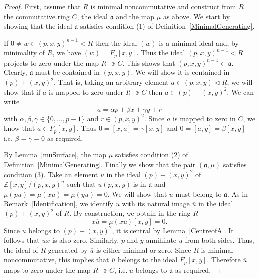 \documentclass[11pt]{article}
\theoremstyle{definition}
\begin{document}
\begin{proof}
First, assume that $R$ is minimal noncommutative and construct from $R$ the commutative ring $C$, the ideal $\mathfrak{a}$ and the map $\mu$ as above. We start by showing that the ideal $\mathfrak{a}$ satisfies condition (1) of Definition~\ref{MinimalGenerating}.

If $0\neq w\in(p,x,y)^{n-1}\lhd R$ then the ideal $(w)$ is a minimal ideal and, by minimality of $R$, we have $(w)=F_p[x,y]$. Thus the ideal $(p,x,y)^{n-1}\lhd R$ projects to zero under the map $R\twoheadrightarrow C$. This shows that $(p,x,y)^{n-1}\subset \mathfrak{a}$. Clearly, $\mathfrak{a}$ must be contained in $(p,x,y)$. We will show it is contained in $(p)+(x,y)^2$. That is, taking an arbitrary element $a\in(p,x,y)\lhd R$, we will show that if $a$ is mapped to zero under $R\twoheadrightarrow C$ then $a\in(p)+(x,y)^2$. We can write
\[a=\alpha p+\beta x +\gamma y+r\]
with $\alpha,\beta,\gamma\in\lbrace0,\ldots,p-1\rbrace$ and $r\in (p,x,y)^2$. Since $a$ is mapped  to zero in $C$, we know that $a\in F_p[x,y]$. Thus $0=[x,a]=\gamma[x,y]$ and $0=[a,y]=\beta[x,y]$ i.e. $\beta=\gamma=0$ as required.

By Lemma~\ref{muSurface}, the map $\mu$ satisfies condition (2) of Definition~\ref{MinimalGenerating}. Finally we show that the pair $(\mathfrak{a},\mu)$ satisfies condition (3). Take an element $u$ in the ideal $(p)+(x,y)^2$ of $\mathbb{Z}[x,y]/(p,x,y)^n$ such that $u(p,x,y)$ is in $\mathfrak{a}$ and $\mu(pu)=\mu(xu)=\mu(yu)=0$. We will show that $u$ must belong to $\mathfrak{a}$. As in Remark~\ref{Identification}, we identify $u$ with its natural image $\overline{u}$ in the ideal $(p)+(x,y)^2$ of $R$. By construction, we obtain in the ring $R$
\[x\overline{u}=\mu(xu)[x,y]=0.\]
Since $\overline{u}$ belongs to $(p)+(x,y)^2$, it is central by Lemma~\ref{CentreofA}. It follows that $\overline{u}x$ is also zero. Similarly, $p$ and $y$ annihilate $\overline{u}$ from both sides. Thus, the ideal of $R$ generated by $\overline{u}$ is either minimal or zero. Since $R$ is minimal noncommutative, this implies that $\overline{u}$ belongs to the ideal $F_p[x,y]$. Therefore $\overline{u}$ maps to zero under the map $R\twoheadrightarrow C$, i.e. $u$ belongs to $\mathfrak{a}$ as required.


\end{proof}
\end{document}
